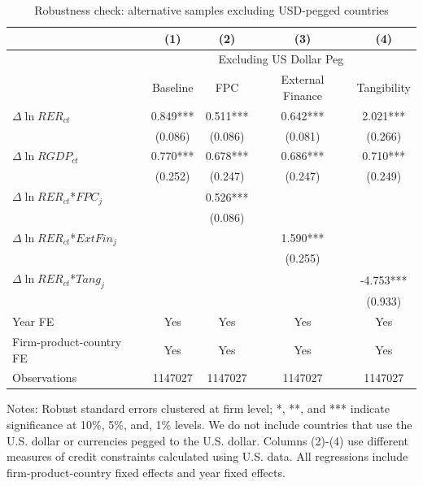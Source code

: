\begin{table}[H]
	\centering
	\caption{Robustness check: alternative samples excluding USD-pegged countries}
	\begin{threeparttable}
	\begin{tabular}{lcccc}
		\toprule
		& (1)   & (2)   & (3)   & (4) \\
		\midrule
		& \multicolumn{4}{c}{Excluding US Dollar Peg} \\
		& Baseline & FPC   & External Finance & Tangibility \\
		\midrule
		$\Delta \ln RER_{ct}$ & 0.849*** & 0.511*** & 0.642*** & 2.021*** \\
		& (0.086) & (0.086) & (0.081) & (0.266) \\
		$\Delta \ln RGDP_{ct}$ & 0.770*** & 0.678*** & 0.686*** & 0.710*** \\
		& (0.252) & (0.247) & (0.247) & (0.249) \\
		$\Delta \ln RER_{ct}$*$FPC_{j}$ &    & 0.526*** &       &  \\
            & & (0.086) &       &  \\
		$\Delta \ln RER_{ct}$*$ExtFin_{j}$ & &       & 1.590*** &  \\
		& &       & (0.255) &  \\
		$\Delta \ln RER_{ct}$*$Tang_{j}$ & &       &       & -4.753*** \\
		& &       &       & (0.933) \\
            \midrule
		Year FE  &   Yes    & Yes   & Yes   & Yes \\
		Firm-product-country FE &   Yes    & Yes   & Yes   & Yes \\
		Observations & 1147027 & 1147027 & 1147027 & 1147027 \\
		\bottomrule
	\end{tabular}
	\begin{tablenotes}
		\footnotesize
		\item Notes: Robust standard errors clustered at firm level; *, **, and *** indicate significance at 10\%, 5\%, and, 1\% levels. We do not include countries that use the U.S. dollar or currencies pegged to the U.S. dollar. Columns (2)-(4) use different measures of credit constraints calculated using U.S. data. All regressions include firm-product-country fixed effects and year fixed effects.
	\end{tablenotes}
        \end{threeparttable}
        \label{tab.robust.nopeg}
\end{table}

